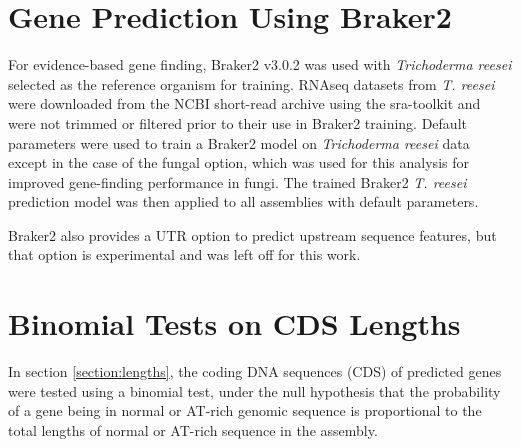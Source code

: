 %

\section{Gene Prediction Using Braker2}
\label{met:braker2}

For evidence-based gene finding, Braker2 v3.0.2\cite{Bruna2021} was
used with \textit{Trichoderma reesei} selected as the reference
organism for training. RNAseq datasets from \textit{T. reesei} were
downloaded from the NCBI short-read archive using the
sra-toolkit\cite{NCBI2025} and were not trimmed or filtered prior to
their use in Braker2 training. Default parameters were used to train a
Braker2 model on \textit{Trichoderma reesei} data except in the case
of the fungal option, which was used for this analysis for improved
gene-finding performance in fungi. The trained Braker2
\textit{T. reesei} prediction model was then applied to all assemblies
with default parameters.

Braker2 also provides a UTR option to predict upstream sequence
features, but that option is experimental and was left off for this
work.


\section{Binomial Tests on CDS Lengths}

In section \ref{section:lengths}, the coding DNA sequences (CDS) of
predicted genes were tested using a binomial test, under the null
hypothesis that the probability of a gene being in normal or AT-rich
genomic sequence is proportional to the total lengths of normal or
AT-rich sequence in the assembly.

